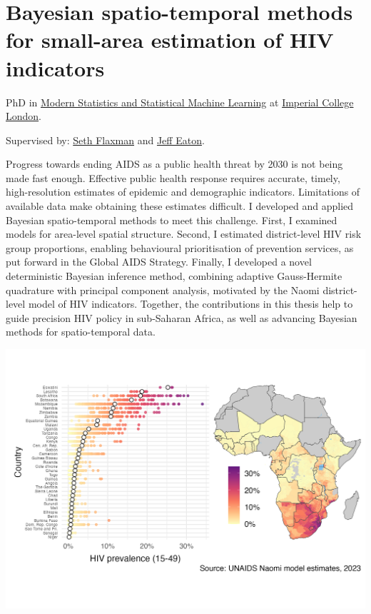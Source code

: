 \documentclass[a4paper, nobind]{templates/ociamthesis}
\begin{document}
\hypertarget{bayesian-spatio-temporal-methods-for-small-area-estimation-of-hiv-indicators}{%
\chapter{Bayesian spatio-temporal methods for small-area estimation of HIV indicators}\label{bayesian-spatio-temporal-methods-for-small-area-estimation-of-hiv-indicators}}

PhD in \href{https://statml.io/}{Modern Statistics and Statistical Machine Learning} at \href{https://www.imperial.ac.uk/}{Imperial College London}.

Supervised by: \href{https://sethrf.com/}{Seth Flaxman} and \href{https://www.imperial.ac.uk/people/jeffrey.eaton}{Jeff Eaton}.

Progress towards ending AIDS as a public health threat by 2030 is not being made fast enough.
Effective public health response requires accurate, timely, high-resolution estimates of epidemic and demographic indicators.
Limitations of available data make obtaining these estimates difficult.
I developed and applied Bayesian spatio-temporal methods to meet this challenge.
First, I examined models for area-level spatial structure.
Second, I estimated district-level HIV risk group proportions, enabling behavioural prioritisation of prevention services, as put forward in the Global AIDS Strategy.
Finally, I developed a novel deterministic Bayesian inference method, combining adaptive Gauss-Hermite quadrature with principal component analysis, motivated by the Naomi district-level model of HIV indicators.
Together, the contributions in this thesis help to guide precision HIV policy in sub-Saharan Africa, as well as advancing Bayesian methods for spatio-temporal data.

\includegraphics{figures/hiv-aids/naomi-continent.png}
\end{document}
